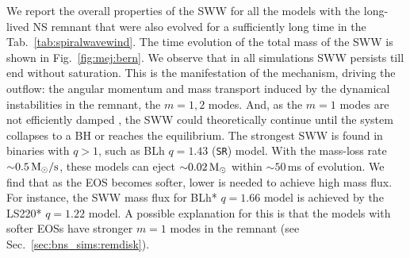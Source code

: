 

We report the overall properties of the \ac{SWW} for all the models with the 
long-lived \ac{NS} remnant that were also evolved for a sufficiently long time 
in the Tab.~\ref{tab:spiralwavewind}. 
%
The time evolution of the total mass of the \ac{SWW} is shown in  Fig.~\ref{fig:mej:bern}.
We observe that in all simulations \ac{SWW} persists till end without saturation.
This is the manifestation of the mechanism, driving the outflow: the 
angular momentum and mass transport induced by the dynamical instabilities in the 
remnant, the $m=1,2$ modes. And, as the $m=1$ modes are not efficiently damped \citep{Paschalidis:2015mla,Radice:2016gym,Lehner:2016wjg,East:2016zvv},
the \ac{SWW} could theoretically continue until the system collapses to a \ac{BH} 
or reaches the equilibrium. %
%
The strongest \ac{SWW} is found in binaries with $q>1$, such as 
BLh $q=1.43$ (\texttt{SR}) model. 
With the mass-loss rate ${\sim}0.5\, {\text{M}_{\odot}}/{\text{s}}$, these models can eject 
${\sim}0.02\,{\text{M}_{\odot}}$ within ${\sim}50\,$ms of \pmerg{} evolution.
%
We find that as the \ac{EOS} becomes softer, lower \mr{} is needed to achieve high  %
mass flux. For instance, the \ac{SWW} mass flux for BLh* $q=1.66$ model is achieved by the 
LS220* $q=1.22$ model. 
A possible explanation for this is that the models with softer \acp{EOS} have stronger 
$m=1$ modes in the remnant (see Sec.~\ref{sec:bns_sims:remdisk}).

